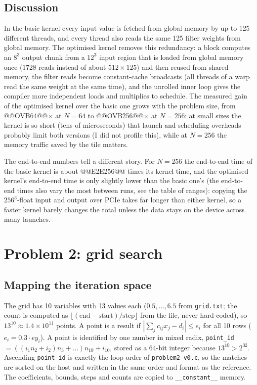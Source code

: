 \documentclass[11pt]{article}
\begin{document}
\subsection*{Discussion}
In the basic kernel every input value is fetched from global memory by up to
125 different threads, and every thread also reads the same 125 filter weights
from global memory. The optimised kernel removes this redundancy: a block
computes an $8^3$ output chunk from a $12^3$ input region that is loaded from
global memory once ($1728$ reads instead of about $512\times125$) and then
reused from shared memory, the filter reads become constant-cache broadcasts
(all threads of a warp read the same weight at the same time), and the
unrolled inner loop gives the compiler more independent loads and multiplies
to schedule. The measured gain of the optimised kernel over the basic one
grows with the problem size, from @@OVB64@@$\times$ at $N=64$ to
@@OVB256@@$\times$ at $N=256$: at small sizes the kernel is so short
(tens of microseconds) that launch and scheduling overheads probably limit
both versions (I did not profile this), while at $N=256$ the memory traffic
saved by the tile matters.

The end-to-end numbers tell a different story. For $N=256$ the end-to-end
time of the basic kernel is about @@E2E256@@ times its kernel time, and the
optimised kernel's end-to-end time is only slightly lower than the basic one's
(the end-to-end times also vary the most between runs, see the table of ranges):
copying the $256^3$-float input and output over PCIe takes far longer than
either kernel, so a faster kernel barely changes the total unless the data
stays on the device across many launches.

\section*{Problem 2: grid search}

\subsection*{Mapping the iteration space}
The grid has 10 variables with 13 values each ($0.5,\dots,6.5$ from
\texttt{grid.txt}; the count is computed as $\lfloor(\mathrm{end}-\mathrm{start})/\mathrm{step}\rfloor$ from
the file, never hard-coded), so $13^{10}\approx1.4\times10^{11}$ points. A
point is a result if $|\sum_j c_{ij}x_j-d_i|\le e_i$ for all 10 rows
($e_i=0.3\cdot ey_i$). A point is identified by one number in mixed radix,
\texttt{point\_id} $=((i_1 n_2+i_2)n_3+\dots)n_{10}+i_{10}$, stored as a 64-bit
integer because $13^{10}>2^{32}$. Ascending \texttt{point\_id} is exactly the
loop order of \texttt{problem2-v0.c}, so the matches are sorted on the host and
written in the same order and format as the reference. The coefficients,
bounds, steps and counts are copied to \texttt{\_\_constant\_\_} memory.
\end{document}
